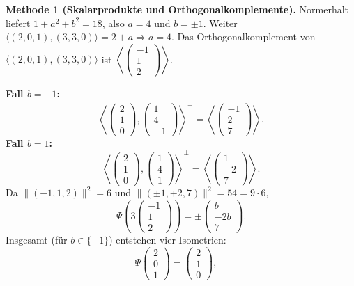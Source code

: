 \documentclass[11pt, a4paper]{article}
\begin{document}
\begin{framed}
\textbf{Methode 1 (Skalarprodukte und Orthogonalkomplemente).}
Normerhalt liefert $1+a^2+b^2=18$, also $a=4$ und $b=\pm1$. Weiter
$\langle (2,0,1),(3,3,0)\rangle=2+a\Rightarrow a=4$. 
Das Orthogonalkomplement von
$\langle(2,0,1),(3,3,0)\rangle$ ist
$\left\langle\begin{pmatrix}-1\\1\\2\end{pmatrix}\right\rangle$.
\medskip

\textbf{Fall $b=-1$:}
\[
\left\langle\begin{pmatrix}2\\1\\0\end{pmatrix},
\begin{pmatrix}1\\4\\-1\end{pmatrix}\right\rangle^{\!\perp}
=\left\langle\begin{pmatrix}-1\\2\\7\end{pmatrix}\right\rangle.
\]
\textbf{Fall $b=1$:}
\[
\left\langle\begin{pmatrix}2\\1\\0\end{pmatrix},
\begin{pmatrix}1\\4\\1\end{pmatrix}\right\rangle^{\!\perp}
=\left\langle\begin{pmatrix}1\\-2\\7\end{pmatrix}\right\rangle.
\]
Da $\bigl\|(-1,1,2)\bigr\|^2=6$ und $\|( \pm1,\mp2,7)\|^2=54=9\cdot6$,
\[
\Psi\!\left(3\begin{pmatrix}-1\\1\\2\end{pmatrix}\right)
=\pm\begin{pmatrix}b\\-2b\\7\end{pmatrix}.
\]
Insgesamt (für $b\in\{\pm1\}$) entstehen vier Isometrien:
\[
\Psi\!\begin{pmatrix}2\\0\\1\end{pmatrix}=\begin{pmatrix}2\\1\\0\end{pmatrix},\quad
\]
\end{framed}
\end{document}
